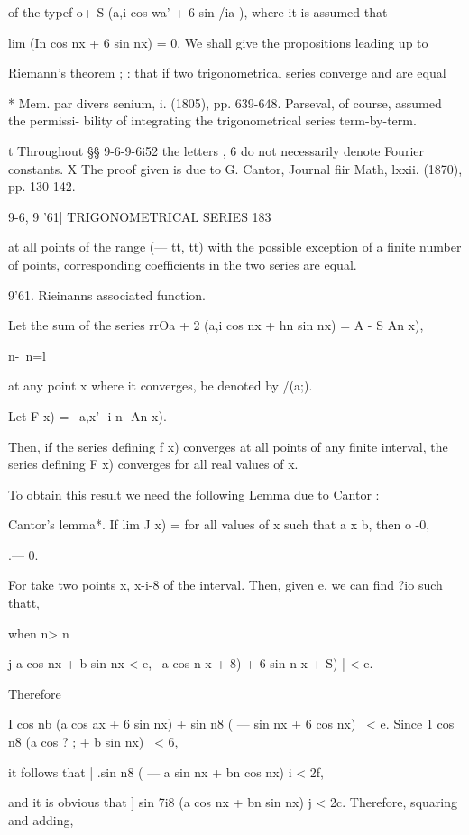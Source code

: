 of the typef o+ S (a,i cos wa' + 6 sin /ia-), where it is assumed that

lim (In cos nx + 6 sin nx) = 0. We shall give the propositions leading
up to

Riemann's theorem ; : that if two trigonometrical series converge and
are equal

* Mem. par divers senium, i. (1805), pp. 639-648. Parseval, of course,
assumed the permissi- bility of integrating the trigonometrical series
term-by-term.

t Throughout §§ 9-6-9-6i52 the letters , 6 do not necessarily denote
Fourier constants. X The proof given is due to G. Cantor, Journal fiir
Math, lxxii. (1870), pp. 130-142.



9-6, 9 '61] TRIGONOMETRICAL SERIES 183

at all points of the range (— tt, tt) with the possible exception of a
finite number of points, corresponding coefficients in the two series
are equal.

9'61. Rieinanns associated function.

Let the sum of the series rrOa + 2 (a,i cos nx + hn sin nx) = A - S An
x),

  n-\ n=l

at any point x where it converges, be denoted by /(a;).

Let F x) = \ a,x'- i n- An x).

Then, if the series defining f x) converges at all points of any
finite interval, the series defining F x) converges for all real
values of x.

To obtain this result we need the following Lemma due to Cantor :

Cantor's lemma*. If lim J x) = for all values of x such that a x b,
then o -0,

 .— 0.

For take two points x, x-i-8 of the interval. Then, given e, we can
find ?io such thatt,

when n> n

j a cos nx + b sin nx < e, \ a cos n x + 8) + 6 sin n x + S) | < e.

Therefore

I cos nb (a cos ax + 6 sin nx) + sin n8 ( — sin nx + 6 cos nx) \ < e.
Since 1 cos n8 (a cos ? ; + b sin nx) \ < 6,

it follows that | .sin n8 ( — a sin nx + bn cos nx) i < 2f,

and it is obvious that ] sin 7i8 (a cos nx + bn sin nx) j < 2c.
Therefore, squaring and adding,

